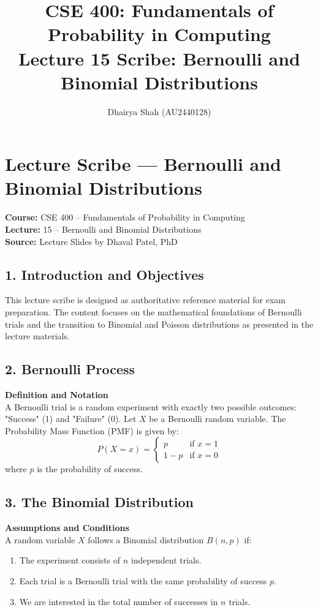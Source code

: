 \documentclass[11pt]{article}
\title{CSE 400: Fundamentals of Probability in Computing \\ Lecture 15 Scribe: Bernoulli and Binomial Distributions}
\author{Dhairya Shah (AU2440128)}
\date{}
\begin{document}
\maketitle

\section*{Lecture Scribe --- Bernoulli and Binomial Distributions}
\textbf{Course:} CSE 400 – Fundamentals of Probability in Computing \\
\textbf{Lecture:} 15 – Bernoulli and Binomial Distributions \\
\textbf{Source:} Lecture Slides by Dhaval Patel, PhD

\subsection*{1. Introduction and Objectives}
This lecture scribe is designed as authoritative reference material for exam preparation. The content focuses on the mathematical foundations of Bernoulli trials and the transition to Binomial and Poisson distributions as presented in the lecture materials.

\subsection*{2. Bernoulli Process}
\textbf{Definition and Notation} \\
A Bernoulli trial is a random experiment with exactly two possible outcomes: "Success" (1) and "Failure" (0).
Let $X$ be a Bernoulli random variable. The Probability Mass Function (PMF) is given by:
\begin{equation}
    P(X=x) = 
    \begin{cases} 
    p & \text{if } x=1 \\
    1-p & \text{if } x=0 
    \end{cases}
\end{equation}
where $p$ is the probability of success.

\subsection*{3. The Binomial Distribution}
\textbf{Assumptions and Conditions} \\
A random variable $X$ follows a Binomial distribution $B(n, p)$ if:
\begin{enumerate}
    \item The experiment consists of $n$ independent trials.
    \item Each trial is a Bernoulli trial with the same probability of success $p$.
    \item We are interested in the total number of successes in $n$ trials.
\end{enumerate}
\end{document}
